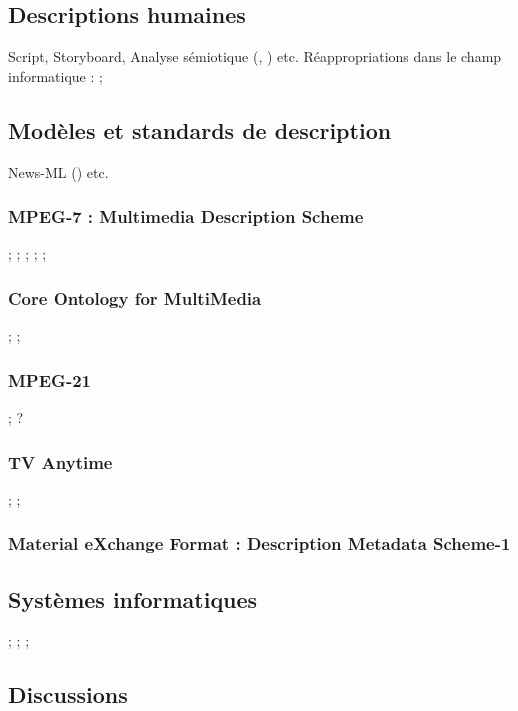 
\subsection{Descriptions humaines}
Script, Storyboard, Analyse sémiotique (\cite{Martin2005}, \cite{ThiBui2003}) etc.
Réappropriations dans le champ informatique : \cite{Chakravarthy2009b} ; \cite{Chakravarthy2009c}

\subsection{Modèles et standards de description}
News-ML (\cite{Nack2004}) etc.

\subsubsection*{MPEG-7 : Multimedia Description Scheme}
\cite{Hunter2001} ; \cite{Troncy2007} ; \cite{Nack2005a} ; \cite{Dasiopoulou2009} ; \cite{Garcia2005} ; 


\subsubsection*{Core Ontology for MultiMedia}
\cite{Arndt2009} ; \cite{Arndt2007} ; \cite{Staab2008} 

\subsubsection*{MPEG-21}
\cite{Burnett2003} ; \cite{Garcia2010} ? 

\subsubsection*{TV Anytime}
\cite{Evain2000} ; \cite{Tsinaraki2004} ; \cite{Tsinaraki2005}

\subsubsection*{Material eXchange Format : Description Metadata Scheme-1}
\cite{Marcos2009}


\subsection{Systèmes informatiques}
\cite{Tsinaraki2005} ; \cite{Tsinaraki2004} ; \cite{Dasiopoulou2009} ;


\subsection{Discussions}
\cite{Burger2011}
